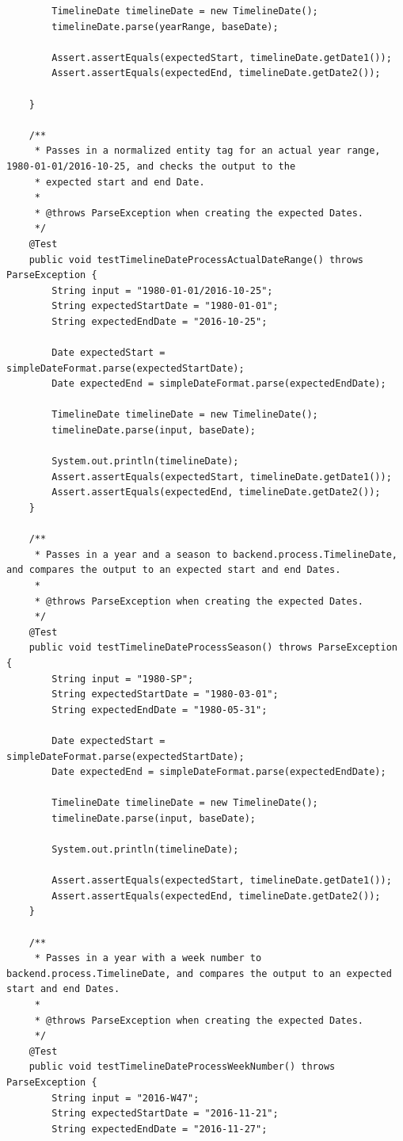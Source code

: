\begin{lstlisting}
        TimelineDate timelineDate = new TimelineDate();
        timelineDate.parse(yearRange, baseDate);

        Assert.assertEquals(expectedStart, timelineDate.getDate1());
        Assert.assertEquals(expectedEnd, timelineDate.getDate2());

    }

    /**
     * Passes in a normalized entity tag for an actual year range, 1980-01-01/2016-10-25, and checks the output to the
     * expected start and end Date.
     *
     * @throws ParseException when creating the expected Dates.
     */
    @Test
    public void testTimelineDateProcessActualDateRange() throws ParseException {
        String input = "1980-01-01/2016-10-25";
        String expectedStartDate = "1980-01-01";
        String expectedEndDate = "2016-10-25";

        Date expectedStart = simpleDateFormat.parse(expectedStartDate);
        Date expectedEnd = simpleDateFormat.parse(expectedEndDate);

        TimelineDate timelineDate = new TimelineDate();
        timelineDate.parse(input, baseDate);

        System.out.println(timelineDate);
        Assert.assertEquals(expectedStart, timelineDate.getDate1());
        Assert.assertEquals(expectedEnd, timelineDate.getDate2());
    }

    /**
     * Passes in a year and a season to backend.process.TimelineDate, and compares the output to an expected start and end Dates.
     *
     * @throws ParseException when creating the expected Dates.
     */
    @Test
    public void testTimelineDateProcessSeason() throws ParseException {
        String input = "1980-SP";
        String expectedStartDate = "1980-03-01";
        String expectedEndDate = "1980-05-31";

        Date expectedStart = simpleDateFormat.parse(expectedStartDate);
        Date expectedEnd = simpleDateFormat.parse(expectedEndDate);

        TimelineDate timelineDate = new TimelineDate();
        timelineDate.parse(input, baseDate);

        System.out.println(timelineDate);

        Assert.assertEquals(expectedStart, timelineDate.getDate1());
        Assert.assertEquals(expectedEnd, timelineDate.getDate2());
    }

    /**
     * Passes in a year with a week number to backend.process.TimelineDate, and compares the output to an expected start and end Dates.
     *
     * @throws ParseException when creating the expected Dates.
     */
    @Test
    public void testTimelineDateProcessWeekNumber() throws ParseException {
        String input = "2016-W47";
        String expectedStartDate = "2016-11-21";
        String expectedEndDate = "2016-11-27";


\end{lstlisting}
